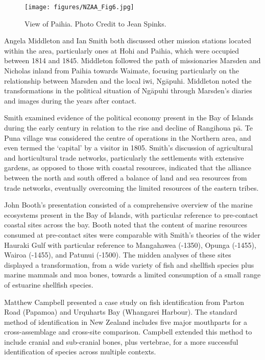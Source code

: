 	\begin{figure}
		\texttt{[image: figures/NZAA\_Fig6.jpg]}
		\centering
		\caption{View of Paihia. Photo Credit to Jean Spinks.}
		\label{fig:NZAA_Fig6}
	\end{figure}
	
Angela Middleton and Ian Smith both discussed other mission stations located within the area, particularly ones at Hohi and Paihia, which were occupied between 1814 and 1845. Middleton followed the path of missionaries Marsden and Nicholas inland from Paihia towards Waimate, focusing particularly on the relationship between Marsden and the local iwi, Ngāpuhi. Middleton noted the transformations in the political situation of Ngāpuhi through Marsden's diaries and images during the years after contact. 

Smith examined evidence of the political economy present in the Bay of Islands during the early  century in relation to the rise and decline of Rangihoua pā. Te Puna village was considered the centre of operations in the Northern area, and even termed the ‘capital’ by a visitor in 1805. Smith’s discussion of agricultural and horticultural trade networks, particularly the settlements with extensive gardens, as opposed to those with coastal resources, indicated that the alliance between the north and south offered a balance of land and sea resources from trade networks, eventually overcoming the limited resources of the eastern tribes.

John Booth’s presentation consisted of a comprehensive overview of the marine ecosystems present in the Bay of Islands, with particular reference to pre-contact coastal sites across the bay. Booth noted that the content of marine resources consumed at pre-contact sites were comparable with Smith’s theories of the wider Hauraki Gulf with particular reference to Mangahawea (-1350), Opunga (-1455), Wairoa (-1455), and Patunui (-1500). The midden analyses of these sites displayed a transformation, from a wide variety of fish and shellfish species plus marine mammals and moa bones, towards a limited consumption of a small range of estuarine shellfish species.

Matthew Campbell presented a case study on fish identification from Parton Road (Papamoa) and Urquharts Bay (Whangarei Harbour). The standard method of identification in New Zealand includes five major mouthparts for a cross-assemblage and cross-site comparison. Campbell extended this method to include cranial and sub-cranial bones, plus vertebrae, for a more successful identification of species across multiple contexts.    
  

